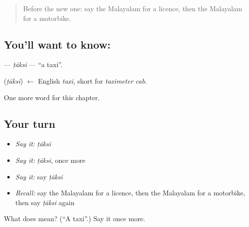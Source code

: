 \begin{quote}
Before the new one: say the Malayalam for a licence, then the Malayalam for a motorbike.
\end{quote}

\subsection*{You'll want to know: }
\textbf{} — \emph{ṭāksi} — \textquotedblleft{}a taxi\textquotedblright{}.

\begin{cousinweb}
\textbf{} (\emph{ṭāksi}) $\leftarrow$ English \emph{taxi}, short for \emph{taximeter cab}.
\end{cousinweb}

\begin{grammarlens}[title={What you've built}]
One more word for this chapter.
\end{grammarlens}

\subsection*{Your turn}
\begin{itemize}
\raggedright
  \item \emph{Say it:} \emph{ṭāksi}
  \item \emph{Say it:} \emph{ṭāksi}, once more
  \item \emph{Say it:} say \emph{ṭāksi}
  \item \emph{Recall:} say the Malayalam for a licence, then the Malayalam for a motorbike, then say \emph{ṭāksi} again
\end{itemize}

\begin{tcolorbox}[breakable,colback=teal!4,colframe=teal!35!black,title={Before you move on}]
What does  mean? (\textquotedblleft{}A taxi\textquotedblright{}.) Say it once more.
\end{tcolorbox}
